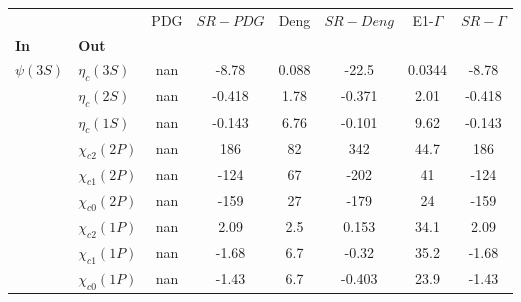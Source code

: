 \begin{tabular}{l|l|c|c|c|c|c|c}
\toprule
           &                 &  PDG &  $SR-PDG$ &  Deng &  $SR-Deng$ &  E1-$\Gamma$ &  $SR-\Gamma$ \\
\textbf{In} & \textbf{Out} &      &           &       &            &              &              \\
\midrule
\textbf{$\psi(3S)$} & \textbf{$\eta_{c}(3S)$} &  nan &     -8.78 & 0.088 &      -22.5 &       0.0344 &        -8.78 \\
           & \textbf{$\eta_{c}(2S)$} &  nan &    -0.418 &  1.78 &     -0.371 &         2.01 &       -0.418 \\
           & \textbf{$\eta_{c}(1S)$} &  nan &    -0.143 &  6.76 &     -0.101 &         9.62 &       -0.143 \\
           & \textbf{$\chi_{c2}(2P)$} &  nan &       186 &    82 &        342 &         44.7 &          186 \\
           & \textbf{$\chi_{c1}(2P)$} &  nan &      -124 &    67 &       -202 &           41 &         -124 \\
           & \textbf{$\chi_{c0}(2P)$} &  nan &      -159 &    27 &       -179 &           24 &         -159 \\
           & \textbf{$\chi_{c2}(1P)$} &  nan &      2.09 &   2.5 &      0.153 &         34.1 &         2.09 \\
           & \textbf{$\chi_{c1}(1P)$} &  nan &     -1.68 &   6.7 &      -0.32 &         35.2 &        -1.68 \\
           & \textbf{$\chi_{c0}(1P)$} &  nan &     -1.43 &   6.7 &     -0.403 &         23.9 &        -1.43 \\
\bottomrule
\end{tabular}
